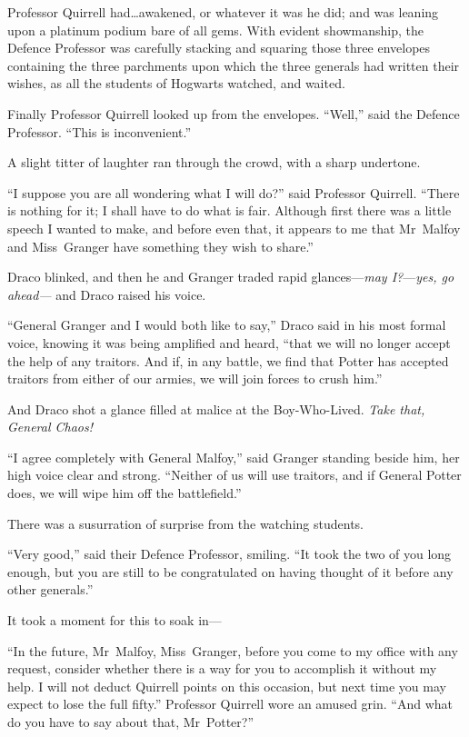 Professor Quirrell had…awakened, or whatever it was he did; and was leaning upon a platinum podium bare of all gems. With evident showmanship, the Defence Professor was carefully stacking and squaring those three envelopes containing the three parchments upon which the three generals had written their wishes, as all the students of Hogwarts watched, and waited.

Finally Professor Quirrell looked up from the envelopes. “Well,” said the Defence Professor. “This is inconvenient.”

A slight titter of laughter ran through the crowd, with a sharp undertone.

“I suppose you are all wondering what I will do?” said Professor Quirrell. “There is nothing for it; I shall have to do what is fair. Although first there was a little speech I wanted to make, and before even that, it appears to me that Mr~Malfoy and Miss~Granger have something they wish to share.”

Draco blinked, and then he and Granger traded rapid glances—\emph{may I?}—\emph{yes, go ahead—} and Draco raised his voice.

“General Granger and I would both like to say,” Draco said in his most formal voice, knowing it was being amplified and heard, “that we will no longer accept the help of any traitors. And if, in any battle, we find that Potter has accepted traitors from either of our armies, we will join forces to crush him.”

And Draco shot a glance filled at malice at the Boy-Who-Lived. \emph{Take that, General Chaos!}

“I agree completely with General Malfoy,” said Granger standing beside him, her high voice clear and strong. “Neither of us will use traitors, and if General Potter does, we will wipe him off the battlefield.”

There was a susurration of surprise from the watching students.

“Very good,” said their Defence Professor, smiling. “It took the two of you long enough, but you are still to be congratulated on having thought of it before any other generals.”

It took a moment for this to soak in—

“In the future, Mr~Malfoy, Miss~Granger, before you come to my office with any request, consider whether there is a way for you to accomplish it without my help. I will not deduct Quirrell points on this occasion, but next time you may expect to lose the full fifty.” Professor Quirrell wore an amused grin. “And what do you have to say about that, Mr~Potter?”

